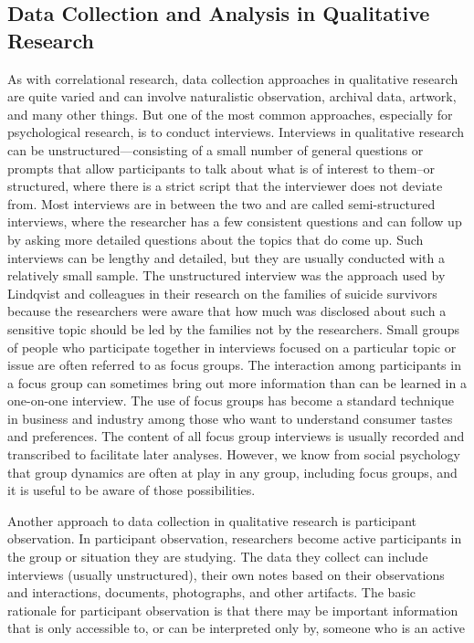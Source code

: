 \subsection{Data Collection and Analysis in Qualitative Research}

As with correlational research, data collection approaches in qualitative research are quite varied and can involve naturalistic observation, archival data, artwork, and many other things. But one of the most common approaches, especially for psychological research, is to conduct interviews. Interviews in qualitative research can be unstructured---consisting of a small number of general questions or prompts that allow participants to talk about what is of interest to them–or structured, where there is a strict script that the interviewer does not deviate from. Most interviews are in between the two and are called semi-structured interviews, where the researcher has a few consistent questions and can follow up by asking more detailed questions about the topics that do come up. Such interviews can be lengthy and detailed, but they are usually conducted with a relatively small sample. The unstructured interview was the approach used by Lindqvist and colleagues in their research on the families of suicide survivors because the researchers were aware that how much was disclosed about such a sensitive topic should be led by the families not by the researchers. Small groups of people who participate together in interviews focused on a particular topic or issue are often referred to as focus groups. The interaction among participants in a focus group can sometimes bring out more information than can be learned in a one-on-one interview. The use of focus groups has become a standard technique in business and industry among those who want to understand consumer tastes and preferences. The content of all focus group interviews is usually recorded and transcribed to facilitate later analyses. However, we know from social psychology that group dynamics are often at play in any group, including focus groups, and it is useful to be aware of those possibilities.

Another approach to data collection in qualitative research is participant observation. In participant observation, researchers become active participants in the group or situation they are studying. The data they collect can include interviews (usually unstructured), their own notes based on their observations and interactions, documents, photographs, and other artifacts. The basic rationale for participant observation is that there may be important information that is only accessible to, or can be interpreted only by, someone who is an active

